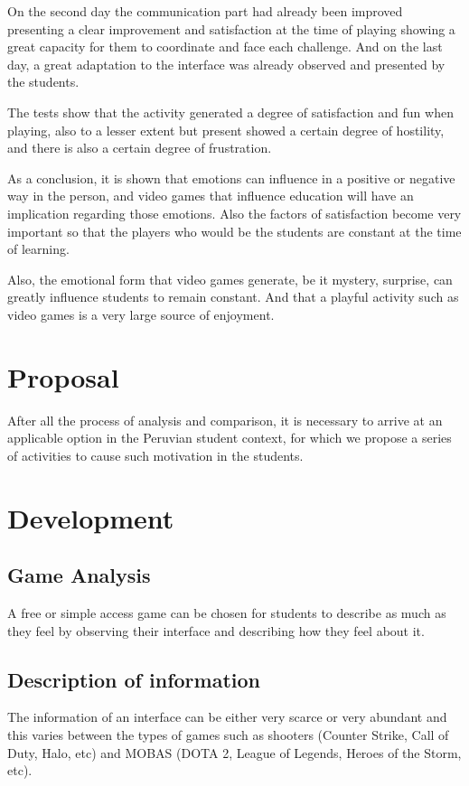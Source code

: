 \documentclass[conference, letterpaper]{IEEEtran}
\begin{document}
On the second day the communication part had already been improved presenting a clear improvement and satisfaction at the time of playing showing a great capacity for them to coordinate and face each challenge. And on the last day, a great adaptation to the interface was already observed and presented by the students.

The tests show that the activity generated a degree of satisfaction and fun when playing, also to a lesser extent but present showed a certain degree of hostility, and there is also a certain degree of frustration. 

As a conclusion, it is shown that emotions can influence in a positive or negative way in the person, and video games that influence education will have an implication regarding those emotions. Also the factors of satisfaction become very important so that the players who would be the students are constant at the time of learning.

Also, the emotional form that video games generate, be it mystery, surprise, can greatly influence students to remain constant. And that a playful activity such as video games is a very large source of enjoyment.

\section{Proposal}
After all the process of analysis and comparison, it is necessary to arrive at an applicable option in the Peruvian student context, for which we propose a series of activities to cause such motivation in the students.

\section{Development}
\subsection{Game Analysis}
A free or simple access game can be chosen for students to describe as much as they feel by observing their interface and describing how they feel about it.
\subsection{Description of information}
The information of an interface can be either very scarce or very abundant and this varies between the types of games such as shooters (Counter Strike, Call of Duty, Halo, etc) and MOBAS (DOTA 2, League of Legends, Heroes of the Storm, etc).
\end{document}
